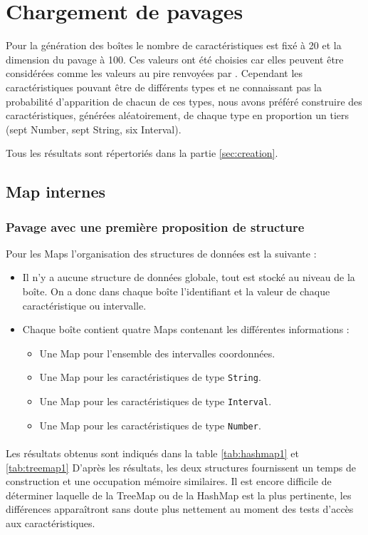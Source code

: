 \section{Chargement de pavages}
\label{chap:Chargement}
Pour la génération des boîtes le nombre de caractéristiques est fixé à 20 et la dimension du pavage à 100. Ces valeurs ont été choisies car elles peuvent être considérées comme les valeurs au pire renvoyées par \realpaver. Cependant les caractéristiques pouvant être de différents types et ne connaissant pas la probabilité d'apparition de chacun de ces types, nous avons préféré construire des caractéristiques, générées aléatoirement, de chaque type en proportion un tiers (sept Number, sept String, six Interval). 

Tous les résultats sont répertoriés dans la partie \ref{sec:creation}.

\subsection{Map internes}

\subsubsection{Pavage avec une première proposition de structure}
Pour les Maps l'organisation des structures de données est la suivante :
\begin{itemize}
\item Il n'y a aucune structure de données globale, tout est stocké au niveau de la boîte. On a donc dans chaque boîte l'identifiant et la valeur de chaque caractéristique ou intervalle.
 \item Chaque boîte contient quatre Maps contenant les différentes informations :
\begin{itemize}
 \item Une Map pour l'ensemble des {\color{red}intervalles coordonnées.}
\item Une Map pour les caractéristiques de type \verb+String+.
\item Une Map pour les caractéristiques de type \verb+Interval+.
\item Une Map pour les caractéristiques de type \verb+Number+.
\end{itemize}
\end{itemize}

\paragraph{}Les résultats obtenus sont indiqués dans la table \ref{tab:hashmap1} et \ref{tab:treemap1}
D'après les résultats, les deux structures fournissent un temps de construction et une occupation mémoire similaires.
Il est encore difficile de déterminer laquelle de la TreeMap ou de la HashMap est la plus pertinente, les différences apparaîtront sans doute plus nettement au moment des tests d'accès aux caractéristiques. 


